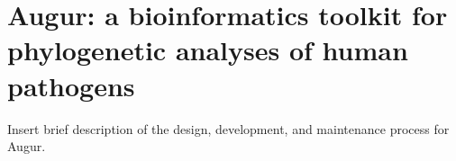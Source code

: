 \chapter{Augur: a bioinformatics toolkit for phylogenetic analyses of human pathogens}

Insert brief description of the design, development, and maintenance process for Augur.
